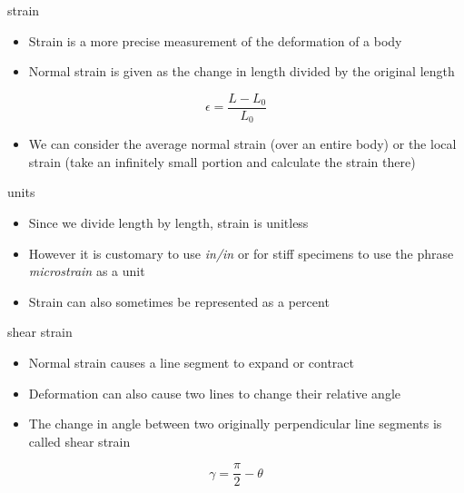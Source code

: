 \documentclass[
  letterpaper,
  ignorenonframetext,
  aspectratio=43,
  handout,
  12pt]{beamer}
\providecommand{\tightlist}{%
  \setlength{\itemsep}{0pt}\setlength{\parskip}{0pt}}
\providecommand{\tightlist}{%
\setlength{\itemsep}{0pt}\setlength{\parskip}{0pt}}
\begin{document}
\begin{frame}{strain}
\protect\hypertarget{strain-1}{}
\begin{itemize}
\tightlist
\item
  Strain is a more precise measurement of the deformation of a body
\item
  Normal strain is given as the change in length divided by the original
  length
\end{itemize}

\[\epsilon = \frac{L-L_0}{L_0}\]

\begin{itemize}
\tightlist
\item
  We can consider the average normal strain (over an entire body) or the
  local strain (take an infinitely small portion and calculate the
  strain there)
\end{itemize}
\end{frame}

\begin{frame}{units}
\protect\hypertarget{units}{}
\begin{itemize}
\tightlist
\item
  Since we divide length by length, strain is unitless
\item
  However it is customary to use \emph{in/in} or for stiff specimens to
  use the phrase \emph{microstrain} as a unit
\item
  Strain can also sometimes be represented as a percent
\end{itemize}
\end{frame}

\begin{frame}{shear strain}
\protect\hypertarget{shear-strain}{}
\begin{itemize}
\tightlist
\item
  Normal strain causes a line segment to expand or contract
\item
  Deformation can also cause two lines to change their relative angle
\item
  The change in angle between two originally perpendicular line segments
  is called shear strain
\end{itemize}

\[\gamma = \frac{\pi}{2} - \theta\]
\end{frame}
\end{document}
